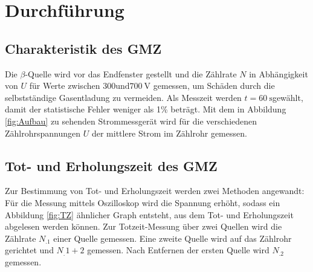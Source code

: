 \section{Durchführung}
\label{sec:Durchführung}

\subsection{Charakteristik des GMZ}
Die $\beta$-Quelle wird vor das Endfenster gestellt und die Zählrate $N$ in Abhängigkeit von $U$ für Werte zwischen $300 \text{und} \SI{700}{\volt}$ gemessen, um Schäden durch die selbstständige Gasentladung zu vermeiden. Als Messzeit werden $t=\SI{60}{\second}$gewählt, damit der statistische Fehler weniger als 1\% beträgt.
Mit dem in Abbildung \ref{fig:Aufbau} zu sehenden Strommessgerät wird für die verschiedenen Zählrohrspannungen $U$ der mittlere Strom im Zählrohr gemessen.

\subsection{Tot- und Erholungszeit des GMZ}
Zur Bestimmung von Tot- und Erholungszeit werden zwei Methoden angewandt:
Für die Messung mittels Oszilloskop wird die Spannung erhöht, sodass ein Abbildung \ref{fig:TZ} ähnlicher Graph entsteht, aus dem Tot- und Erholungszeit abgelesen werden können.
\newline\newline
Zur Totzeit-Messung über zwei Quellen wird die Zählrate $N_.1$ einer Quelle gemessen.
Eine zweite Quelle wird auf das Zählrohr gerichtet und $N_.{1+2}$ gemessen.
Nach Entfernen der ersten Quelle wird $N_.2$ gemessen.
